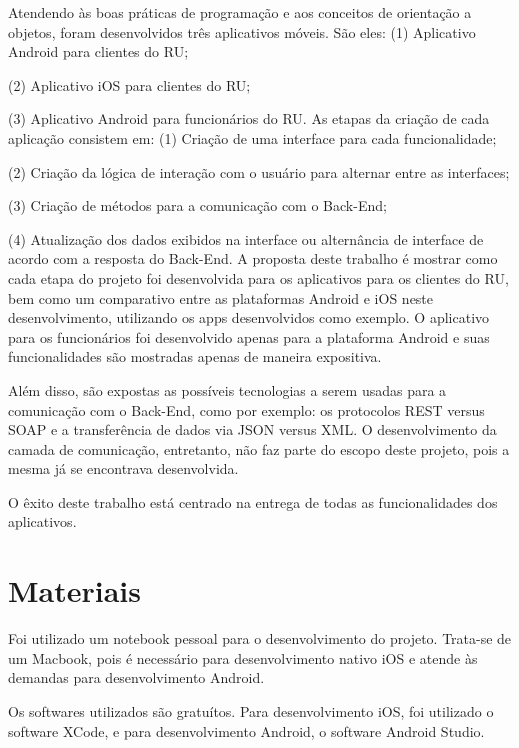 Atendendo às boas práticas de programação e aos conceitos de orientação a objetos,
foram desenvolvidos três aplicativos móveis. São eles:
\bigbreak
(1) Aplicativo Android para clientes do RU;
\par(2) Aplicativo iOS para clientes do RU;
\par(3) Aplicativo Android para funcionários do RU.
\bigbreak
As etapas da criação de cada aplicação consistem em:
\bigbreak
(1) Criação de uma interface para cada funcionalidade;
\par(2) Criação da lógica de interação com o usuário para alternar entre as 
interfaces;
\par(3) Criação de métodos para a comunicação com o Back-End;
\par(4) Atualização dos dados exibidos na interface ou alternância de interface
 de acordo com a resposta do Back-End.
\bigbreak
 A proposta deste trabalho é mostrar como cada etapa do projeto foi 
 desenvolvida para os aplicativos para os clientes do RU, bem como um comparativo entre as 
 plataformas Android e iOS neste desenvolvimento, utilizando os apps desenvolvidos como
 exemplo. O aplicativo para os funcionários foi desenvolvido apenas para a 
 plataforma Android e suas funcionalidades são mostradas apenas de maneira 
 expositiva.
 
 Além disso, são expostas as possíveis tecnologias a serem usadas para a 
 comunicação com o Back-End, como por exemplo: os protocolos REST versus SOAP
 e a transferência de dados via JSON versus XML. O desenvolvimento da camada de 
 comunicação, entretanto, não faz parte do escopo deste projeto, pois a mesma já se encontrava 
 desenvolvida.

O êxito deste trabalho está centrado na entrega de todas as funcionalidades dos 
aplicativos.

\vspace{0.4cm}
\section{Materiais}
	
Foi utilizado um notebook pessoal para o desenvolvimento do projeto. Trata-se 
de um Macbook, pois é necessário para desenvolvimento nativo iOS e atende às demandas para 
desenvolvimento Android.

Os softwares utilizados são gratuítos. Para desenvolvimento iOS, foi utilizado o 
software XCode, e para desenvolvimento Android, o software Android Studio.

\vspace{0.4cm}
